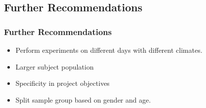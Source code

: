 \documentclass[compress,handout,10pt]{beamer}
\let\olditem\item
\renewcommand{\item}{\setlength{\itemsep}{0.5\baselineskip}\olditem}
\begin{document}
\subsection{Further Recommendations}
\begin{frame}
    \frametitle{Further Recommendations}
\begin{itemize}
\item Perform experiments on different days with different climates.
\item Larger subject population
\item Specificity in project objectives 
\item Split sample group based on gender and age.
\end{itemize}
\end{frame}

\begin{frame}[plain]
    \titlepage
\end{frame}
\end{document}
